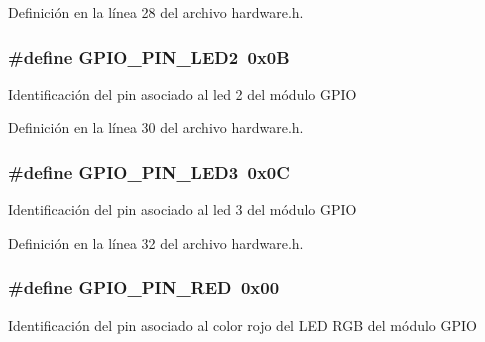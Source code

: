 Definición en la línea 28 del archivo hardware.\+h.

\subsubsection[{\texorpdfstring{G\+P\+I\+O\+\_\+\+P\+I\+N\+\_\+\+L\+E\+D2}{GPIO_PIN_LED2}}]{\setlength{\rightskip}{0pt plus 5cm}\#define G\+P\+I\+O\+\_\+\+P\+I\+N\+\_\+\+L\+E\+D2~0x0B}\hypertarget{group__hardware_ga5ada73f73636a4fbf726468eb63eb945}{}\label{group__hardware_ga5ada73f73636a4fbf726468eb63eb945}
Identificación del pin asociado al led 2 del módulo G\+P\+IO 

Definición en la línea 30 del archivo hardware.\+h.

\subsubsection[{\texorpdfstring{G\+P\+I\+O\+\_\+\+P\+I\+N\+\_\+\+L\+E\+D3}{GPIO_PIN_LED3}}]{\setlength{\rightskip}{0pt plus 5cm}\#define G\+P\+I\+O\+\_\+\+P\+I\+N\+\_\+\+L\+E\+D3~0x0C}\hypertarget{group__hardware_ga9e7e83187eae26d02136f609392fabd0}{}\label{group__hardware_ga9e7e83187eae26d02136f609392fabd0}
Identificación del pin asociado al led 3 del módulo G\+P\+IO 

Definición en la línea 32 del archivo hardware.\+h.

\subsubsection[{\texorpdfstring{G\+P\+I\+O\+\_\+\+P\+I\+N\+\_\+\+R\+ED}{GPIO_PIN_RED}}]{\setlength{\rightskip}{0pt plus 5cm}\#define G\+P\+I\+O\+\_\+\+P\+I\+N\+\_\+\+R\+ED~0x00}\hypertarget{group__hardware_gaa4aae4b49bb53e52b78b530637dcd2d7}{}\label{group__hardware_gaa4aae4b49bb53e52b78b530637dcd2d7}
Identificación del pin asociado al color rojo del L\+ED R\+GB del módulo G\+P\+IO 

